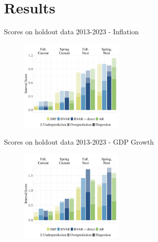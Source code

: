 \documentclass[en]{sdqbeamer}
\begin{document}
\section{Results}
\begin{frame}{Scores on holdout data 2013-2023 - Inflation}
    \begin{figure}
        \centering
        \includegraphics[width=0.45\textwidth]{figures/wis_pcpi_pch_ho.pdf} 
        \label{fig:enter-label}
    \end{figure} 
\end{frame}

\begin{frame}{Scores on holdout data 2013-2023 - GDP Growth}
    \begin{figure}
        \centering
        \includegraphics[width=0.45\textwidth]{figures/wis_ngdp_rpch_ho.pdf} 
        \label{fig:enter-label}
    \end{figure} 
\end{frame}
\end{document}
